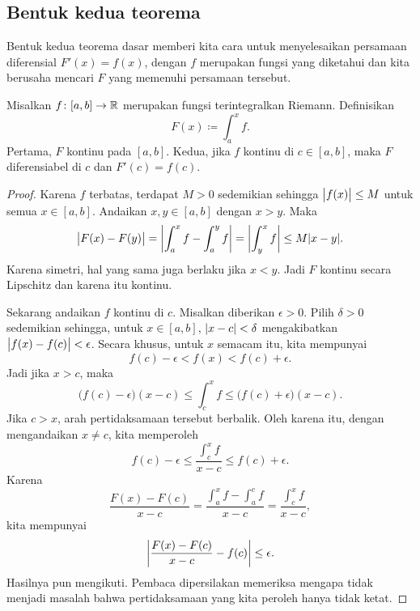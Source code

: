 \subsection{Bentuk kedua teorema}

Bentuk kedua teorema dasar memberi kita cara untuk menyelesaikan
persamaan diferensial $F'(x) = f(x)$, dengan $f$ merupakan fungsi yang diketahui
dan kita berusaha mencari $F$ yang memenuhi persamaan tersebut.

\begin{thm} \label{thm:FTCv2}
Misalkan $f \colon [a,b] \to {\mathbb{R}}$ merupakan fungsi terintegralkan Riemann.  Definisikan
\begin{equation*}
F(x) \coloneqq \int_a^x f .
\end{equation*}
Pertama, $F$ kontinu pada $[a,b]$.  Kedua,
jika $f$ kontinu di $c \in [a,b]$, maka $F$ diferensiabel di $c$
dan $F'(c) = f(c)$.
\end{thm}

\begin{proof}
Karena $f$ terbatas, terdapat $M > 0$
sedemikian sehingga $\bigl\lvert {f(x)} \bigr\rvert \leq M$ untuk semua $x \in [a,b]$.  Andaikan $x,y \in [a,b]$
dengan $x > y$.  Maka
\begin{equation*}
\bigl\lvert {F(x)-F(y)} \bigr\rvert =
\left\lvert {\int_a^x f - \int_a^y f} \right\rvert
=
\left\lvert {\int_y^x f} \right\rvert
\leq
M\lvert {x-y} \rvert .
\end{equation*}
Karena simetri, hal yang sama juga berlaku jika $x < y$.
Jadi $F$ kontinu secara Lipschitz dan karena itu kontinu.

Sekarang andaikan $f$ kontinu di $c$.
Misalkan diberikan $\epsilon > 0$.  Pilih $\delta > 0$ sedemikian sehingga,
untuk $x \in [a,b]$,
$\lvert {x-c} \rvert < \delta$ mengakibatkan $\bigl\lvert {f(x)-f(c)} \bigr\rvert < \epsilon$.
Secara khusus,
untuk $x$ semacam itu, kita mempunyai
\begin{equation*}
f(c)-\epsilon < f(x) < f(c) + \epsilon.
\end{equation*}
Jadi jika $x > c$, maka
\begin{equation*}
\bigl(f(c)-\epsilon\bigr) (x-c) \leq \int_c^x f \leq
\bigl(f(c) + \epsilon\bigr)(x-c).
\end{equation*}
Jika $c > x$, arah pertidaksamaan tersebut berbalik.  Oleh karena itu,
dengan mengandaikan $x \neq c$, kita memperoleh
\begin{equation*}
f(c)-\epsilon
\leq
\frac{\int_c^{x} f}{x-c}
\leq
f(c)+\epsilon .
\end{equation*}
Karena
\begin{equation*}
\frac{F(x)-F(c)}{x-c}
=
\frac{\int_a^{x} f - \int_a^{c} f}{x-c}
=
\frac{\int_c^{x} f}{x-c} ,
\end{equation*}
kita mempunyai
\begin{equation*}
\left\lvert {\frac{F(x)-F(c)}{x-c} - f(c)} \right\rvert \leq \epsilon .
\end{equation*}
Hasilnya pun mengikuti.  Pembaca dipersilakan memeriksa mengapa tidak menjadi masalah bahwa
pertidaksamaan yang kita peroleh hanya tidak ketat.
\end{proof}

